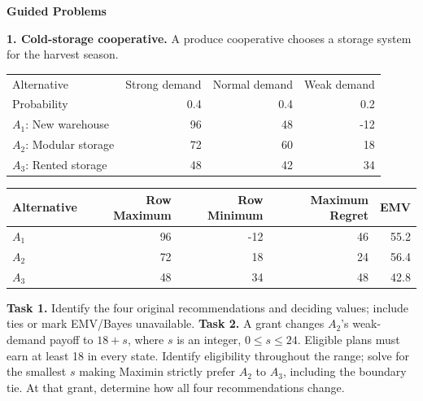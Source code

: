 \begin{studentproblem}
\textbf{Guided Problems}\par\smallskip
\textbf{1. Cold-storage cooperative.} A produce cooperative chooses a storage system for the harvest season.
\begin{center}\begin{tabular}{lrrr}\toprule Alternative & Strong demand & Normal demand & Weak demand\\
Probability & 0.4 & 0.4 & 0.2\\
\midrule
$A_1$: New warehouse & 96 & 48 & -12\\
$A_2$: Modular storage & 72 & 60 & 18\\
$A_3$: Rented storage & 48 & 42 & 34\\
\bottomrule\end{tabular}\end{center}
\begin{center}\begin{tabular}{lrrrr}\toprule Alternative & Row Maximum & Row Minimum & Maximum Regret & EMV\\\midrule
$A_1$ & 96 & -12 & 46 & 55.2\\
$A_2$ & 72 & 18 & 24 & 56.4\\
$A_3$ & 48 & 34 & 48 & 42.8\\
\bottomrule\end{tabular}\end{center}
\textbf{Task 1.} Identify the four original recommendations and deciding values; include ties or mark EMV/Bayes unavailable.
\choices
\textbf{Task 2.} A grant changes $A_2$'s weak-demand payoff to $18+s$, where $s$ is an integer, $0\leq s\leq24$. Eligible plans must earn at least 18 in every state. Identify eligibility throughout the range; solve for the smallest $s$ making Maximin strictly prefer $A_2$ to $A_3$, including the boundary tie. At that grant, determine how all four recommendations change.
\tasktwobox
\end{studentproblem}

